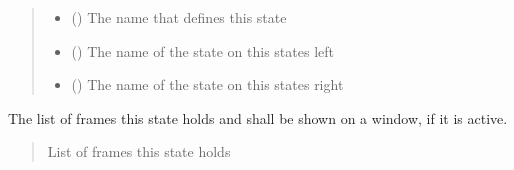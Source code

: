 \documentclass[letterpaper,10pt,english]{sphinxmanual}
\begin{document}
\begin{fulllineitems}
\begin{fulllineitems}
\begin{quote}
\begin{description}
\begin{itemize}
\item {} 
\sphinxAtStartPar
{} ({\hyperref[\detokenize{apidoc/src.osm_configurator.view.states:src.osm_configurator.view.states.state_name_enum.StateName}]{}}) \textendash{} The name that defines this state

\item {} 
\sphinxAtStartPar
{} ({\hyperref[\detokenize{apidoc/src.osm_configurator.view.states:src.osm_configurator.view.states.state_name_enum.StateName}]{}}) \textendash{} The name of the state on this states left

\item {} 
\sphinxAtStartPar
{} ({\hyperref[\detokenize{apidoc/src.osm_configurator.view.states:src.osm_configurator.view.states.state_name_enum.StateName}]{}}) \textendash{} The name of the state on this states right

\end{itemize}

\end{description}\end{quote}

\end{fulllineitems}


\begin{fulllineitems}
\label{\detokenize{apidoc/src.osm_configurator.view.states:src.osm_configurator.view.states.state.State.get_active_frames}}
\pysigstartsignatures
{}
\pysigstopsignatures
\sphinxAtStartPar
The list of frames this state holds and shall be shown on a window, if it is active.
\begin{quote}\begin{description}
\sphinxAtStartPar
List of frames this state holds

\sphinxAtStartPar
{}


\end{description}
\end{quote}
\end{fulllineitems}
\end{fulllineitems}
\end{document}
